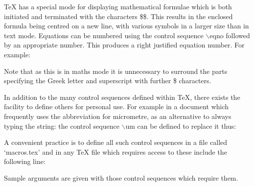 {\TeX} has a special mode for displaying mathematical formulae which
is both initiated and terminated with the characters \$\$.
This results in the enclosed formula being centred on a new line, with
various symbols in a larger size than in text mode.
Equations can be numbered using the control sequence $\backslash$eqno
followed by an appropriate number.
This produces a right justified equation number.
For example:
\medskip
{}

Note that as this is in maths mode it is unnecessary to surround the
parts specifying the Greek letter and superscript with further \$ characters.



In addition to the many control sequences defined within \TeX, there exists
the facility to define others for personal use.
For example in a document which frequently uses the abbreviation for
micrometre, as an alternative to always typing the string:
\medskip
{}
the control sequence $\backslash$um can be defined to replace it thus:
\medskip
{}

\rm
A convenient practice is to define all such control sequences in a file
called `macros.tex' and in any {\TeX} file which requires access to these
include the following line:
\medskip
{}

\vfill\eject


\nobreak

Sample arguments are given with those control sequences which
require them.

\nobreak





